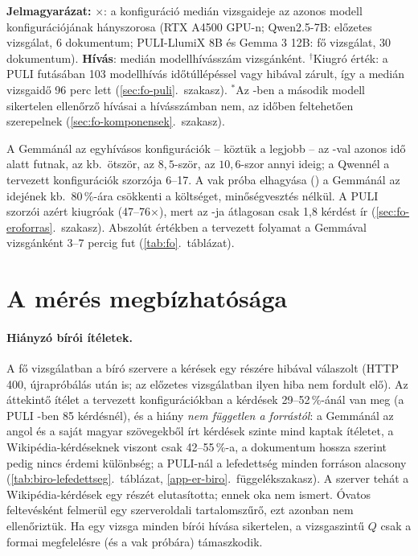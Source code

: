 \begin{table}[htbp]
\vspace{4pt}
\begin{minipage}{\textwidth}
\footnotesize\noindent\textbf{Jelmagyarázat:}
$\times$: a konfiguráció medián vizsgaideje az azonos modell  konfigurációjának hányszorosa (RTX A4500 GPU-n; Qwen2.5-7B: előzetes vizsgálat, 6 dokumentum; PULI-LlumiX 8B és Gemma 3 12B: fő vizsgálat, 30 dokumentum).
\textbf{Hívás}: medián modellhívásszám vizsgánként.
$^\dagger$Kiugró érték: a PULI  futásában 103 modellhívás időtúllépéssel vagy hibával zárult, így a medián vizsgaidő 96 perc lett (\ref{sec:fo-puli}.~szakasz).
$^\ast$Az -ben a második modell sikertelen ellenőrző hívásai a hívásszámban nem, az időben feltehetően szerepelnek (\ref{sec:fo-komponensek}.~szakasz).
\end{minipage}
\end{table}

A Gemmánál az egyhívásos konfigurációk -- köztük a legjobb  -- az -val azonos idő alatt
futnak, az  kb.\ ötször, az  $8{,}5$-ször, az  $10{,}6$-szor annyi ideig; a Qwennél a
tervezett konfigurációk szorzója 6--17. A vak próba elhagyása () a Gemmánál az  idejének kb.\
80\,\%-ára csökkenti a költséget, minőségvesztés nélkül. A PULI szorzói azért kiugróak (47--76$\times$), mert
az \arm{E0}-ja átlagosan csak 1,8 kérdést ír (\ref{sec:fo-eroforras}.~szakasz). Abszolút értékben a tervezett
folyamat a Gemmával vizsgánként 3--7 percig fut (\ref{tab:fo}.~táblázat).

\section{A mérés megbízhatósága}
\label{sec:fo-meres}

\paragraph{Hiányzó bírói ítéletek.} A fő vizsgálatban a bíró szervere a kérések egy részére hibával válaszolt
(HTTP 400, újrapróbálás után is; az előzetes vizsgálatban ilyen hiba nem fordult elő). Az áttekintő ítélet a
tervezett konfigurációkban a kérdések 29--52\,\%-ánál van meg (a PULI \arm{E2}-ben 85 kérdésnél), és a hiány
\emph{nem független a forrástól}: a Gemmánál az angol és a saját magyar szövegekből írt kérdések szinte mind
kaptak ítéletet, a Wikipédia-kérdéseknek viszont csak 42--55\,\%-a, a dokumentum hossza szerint pedig nincs
érdemi különbség; a PULI-nál a lefedettség minden forráson alacsony (\ref{tab:biro-lefedettseg}.~táblázat,
\ref{app-er-biro}.~függelékszakasz). A szerver tehát a Wikipédia-kérdések egy részét elutasította; ennek oka nem
ismert. Óvatos feltevésként felmerül egy szerveroldali tartalomszűrő, ezt azonban nem ellenőriztük. Ha egy vizsga
minden bírói hívása sikertelen, a vizsgaszintű $Q$ csak a formai megfelelésre (és a vak próbára) támaszkodik.

